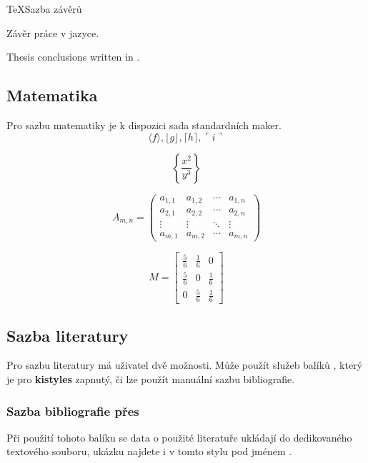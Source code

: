 \documentclass[
  biblatex,
  glossaries,
  index
]{kidiplom}
\begin{document}
\begin{kicode}{TeX}{}{Sazba závěrů}
  \begin{kiconclusions}
    Závěr práce v  jazyce.
  \end{kiconclusions}

  \begin{kiconclusions}[english]
    Thesis conclusions written in .
  \end{kiconclusions}
\end{kicode}

\subsection{Matematika}
Pro sazbu matematiky je k dispozici sada standardních maker.
$$\langle f \rangle, \lfloor g \rfloor,
  \lceil h \rceil, \ulcorner i \urcorner$$

$$\left\{\frac{x^2}{y^3}\right\}$$

$$
  A_{m,n} =
  \begin{pmatrix}
    a_{1,1} & a_{1,2} & \cdots & a_{1,n} \\
    a_{2,1} & a_{2,2} & \cdots & a_{2,n} \\
    \vdots  & \vdots  & \ddots & \vdots  \\
    a_{m,1} & a_{m,2} & \cdots & a_{m,n}
  \end{pmatrix}
$$

$$
  M = \begin{bmatrix}
    \frac{5}{6} & \frac{1}{6} & 0           \\[0.3em]
    \frac{5}{6} & 0           & \frac{1}{6} \\[0.3em]
    0           & \frac{5}{6} & \frac{1}{6}
  \end{bmatrix}
$$

\subsection{Sazba literatury}
Pro sazbu literatury má uživatel dvě možnosti. Může použít služeb balíků \BibLaTeX{}, který je pro \textbf{kistyles} zapnutý, či lze použít manuální sazbu bibliografie.
\subsubsection{Sazba bibliografie přes \BibLaTeX{}}
Při použití tohoto balíku se data o použité literatuře ukládají do dedikovaného textového souboru, ukázku najdete i v tomto stylu pod jménem .
\end{document}
